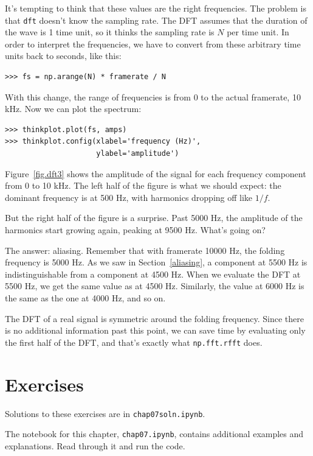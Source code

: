 \documentclass[12pt]{book}
\begin{document}
It's tempting to think that these values are the right frequencies.
The problem is that {\tt dft} doesn't know the sampling rate.  The DFT
assumes that the duration of the wave is 1 time unit, so it thinks the
sampling rate is $N$ per time unit.  In order to interpret the
frequencies, we have to convert from these arbitrary time units back
to seconds, like this:

\begin{verbatim}
>>> fs = np.arange(N) * framerate / N
\end{verbatim}

With this change, the range of frequencies is from 0 to the actual
framerate, 10 kHz.  Now we can plot the spectrum:

\begin{verbatim}
>>> thinkplot.plot(fs, amps)
>>> thinkplot.config(xlabel='frequency (Hz)', 
                     ylabel='amplitude')
\end{verbatim}

Figure~\ref{fig.dft3} shows the amplitude of the signal for each
frequency component from 0 to 10 kHz.  The left half of the figure
is what we should expect: the dominant frequency is at 500 Hz, with
harmonics dropping off like $1/f$.

But the right half of the figure is a surprise.  Past 5000 Hz, the
amplitude of the harmonics start growing again, peaking at 9500 Hz.
What's going on?

The answer: aliasing.  Remember that with framerate 10000 Hz, the
folding frequency is 5000 Hz.  As we saw in Section~\ref{aliasing},
a component at 5500 Hz is indistinguishable from a component
at 4500 Hz.  When we evaluate the DFT at 5500 Hz, we get the same
value as at 4500 Hz.  Similarly, the value at 6000 Hz is the same
as the one at 4000 Hz, and so on.

The DFT of a real signal is symmetric around the folding frequency.
Since there is no additional information past this point, we can
save time by evaluating only the first half of the DFT,
and that's exactly what {\tt np.fft.rfft} does.



\section{Exercises}

Solutions to these exercises are in {\tt chap07soln.ipynb}.


\begin{exercise}
The notebook for this chapter, {\tt chap07.ipynb}, contains
additional examples and explanations.  Read through it and run
the code.
\end{exercise}
\end{document}
